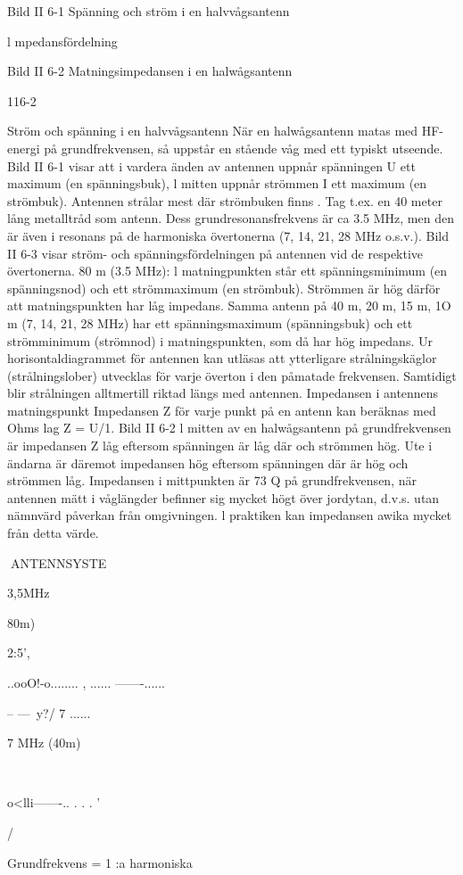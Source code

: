 {Bild II 6-1 Spänning och ström i en
halvvågsantenn

l mpedansfördelning

Bild II 6-2 Matningsimpedansen
i en halwågsantenn

116-2

Ström och spänning i en halvvågsantenn
När en halwågsantenn matas med HF-energi på grundfrekvensen, så uppstår en stående våg med ett typiskt utseende.
Bild II 6-1 visar att i vardera änden av
antennen uppnår spänningen U ett maximum (en spänningsbuk), l mitten uppnår
strömmen I ett maximum (en strömbuk).
Antennen strålar mest där strömbuken finns .
Tag t.ex. en 40 meter lång metalltråd
som antenn. Dess grundresonansfrekvens
är ca 3.5 MHz, men den är även i resonans
på de harmoniska övertonerna (7, 14, 21,
28 MHz o.s.v.).
Bild II 6-3 visar ström- och spänningsfördelningen på antennen vid de respektive
övertonerna.
80 m (3.5 MHz):
l matningpunkten står ett spänningsminimum (en spänningsnod) och ett strömmaximum (en strömbuk). Strömmen är hög
därför att matningspunkten har låg impedans.
Samma antenn på 40 m, 20 m, 15 m, 1O
m (7, 14, 21, 28 MHz) har ett spänningsmaximum (spänningsbuk) och ett strömminimum (strömnod) i matningspunkten, som
då har hög impedans.
Ur horisontaldiagrammet för antennen
kan utläsas att ytterligare strålningskäglor
(strålningslober) utvecklas för varje överton
i den påmatade frekvensen. Samtidigt blir
strålningen alltmertill riktad längs med antennen.
Impedansen i antennens matningspunkt
Impedansen Z för varje punkt på en antenn
kan beräknas med Ohms lag Z = U/1.
Bild II 6-2
l mitten av en halwågsantenn på grundfrekvensen är impedansen Z låg eftersom
spänningen är låg där och strömmen hög.
Ute i ändarna är däremot impedansen hög
eftersom spänningen där är hög och strömmen låg.
Impedansen i mittpunkten är 73 Q på
grundfrekvensen, när antennen mätt i våglängder befinner sig mycket högt över jordytan, d.v.s. utan nämnvärd påverkan från
omgivningen. l praktiken kan impedansen
awika mycket från detta värde.

ANTENNSYSTE

3,5MHz {80m)

2:5',

..ooO!-o........
, ......
-------......

-- ---~y?/ 7
......

7 MHz (40m)

~

o<lli-------.. . . .
'

/

Grundfrekvens =
1 :a harmoniska

}}

